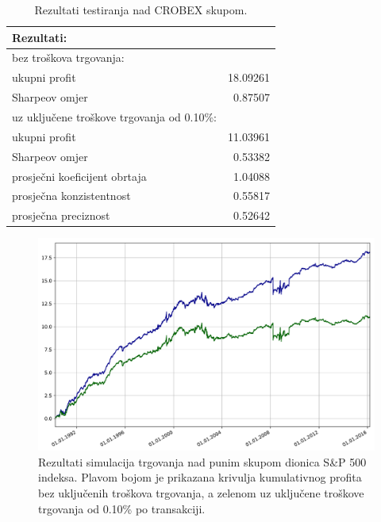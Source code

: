 \documentclass[lmodern, utf8, diplomski, numeric]{fer}
\begin{document}
  \begin{table}[h]
    \centering
    \caption{Rezultati testiranja nad CROBEX skupom.}
    \label{table:spfull2}
    \begin{tabular}{lr}
      \toprule
      Rezultati: & \\
      \midrule
      bez troškova trgovanja: & \\
      ukupni profit & 18.09261 \\
      Sharpeov omjer & 0.87507 \\
      \midrule
      {uz uključene troškove trgovanja od 0.10\%:} & \\
      ukupni profit & 11.03961 \\
      Sharpeov omjer & 0.53382 \\
      \midrule
      prosječni koeficijent obrtaja & 1.04088 \\
      prosječna konzistentnost & 0.55817 \\
      prosječna preciznost & 0.52642 \\
      \bottomrule
    \end{tabular}
  \end{table}

  \begin{figure}[p]
    \centering
    \includegraphics[width=\linewidth]{graphics/sp500full-profits.pdf}
    \caption{Rezultati simulacija trgovanja nad punim skupom dionica S\&P 500 indeksa. Plavom bojom je prikazana krivulja kumulativnog profita bez uključenih troškova trgovanja, a zelenom uz uključene troškove trgovanja od 0.10\% po transakciji.}
    \label{fig:results2}
  \end{figure}
\end{document}
